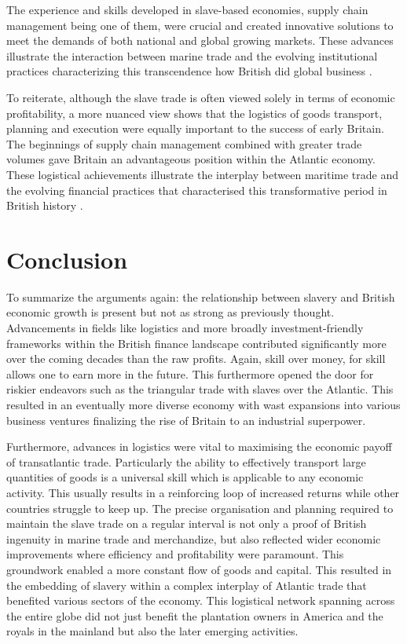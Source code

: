 \documentclass[a4paper,11pt]{article}
\begin{document}
The experience and skills developed in slave-based economies, supply chain management being one of them, were crucial and created innovative solutions to meet the demands of both national and global growing markets. These advances illustrate the interaction between marine trade and the evolving institutional practices characterizing this transcendence how British did global business \citep{berghudson2021}.

To reiterate, although the slave trade is often viewed solely in terms of economic profitability, a more nuanced view shows that the logistics of goods transport, planning and execution were equally important to the success of early Britain. The beginnings of supply chain management combined with greater trade volumes gave Britain an advantageous position within the Atlantic economy. These logistical achievements illustrate the interplay between maritime trade and the evolving financial practices that characterised this transformative period in British history \citep{harley2015}.

\section{Conclusion}

To summarize the arguments again: the relationship between slavery and British economic growth is present but not as strong as previously thought. Advancements in fields like logistics and more broadly investment-friendly frameworks within the British finance landscape contributed significantly more over the coming decades than the raw profits. Again, skill over money, for skill allows one to earn more in the future. This furthermore opened the door for riskier endeavors such as the triangular trade with slaves over the Atlantic. This resulted in an eventually more diverse economy with wast expansions into various business ventures finalizing the rise of Britain to an industrial superpower.

Furthermore, advances in logistics were vital to maximising the economic payoff of transatlantic trade. Particularly the ability to effectively transport large quantities of goods is a universal skill which is applicable to any economic activity. This usually results in a reinforcing loop of increased returns while other countries struggle to keep up. The precise organisation and planning required to maintain the slave trade on a regular interval is not only a proof of British ingenuity in marine trade and merchandize, but also reflected wider economic improvements where efficiency and profitability were paramount. This groundwork enabled a more constant flow of goods and capital. This resulted in the embedding of slavery within a complex interplay of Atlantic trade that benefited various sectors of the economy. This logistical network   spanning across the entire globe did not just benefit the plantation owners in America and the royals in the mainland but also the later emerging activities.
\end{document}
